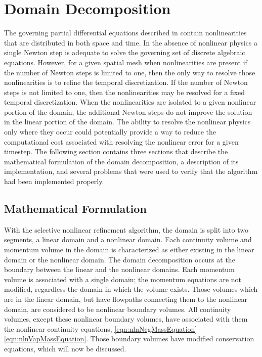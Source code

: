 \chapter{Domain Decomposition}
\label{chap:domain_decomposition}
The governing partial differential equations described in  contain nonlinearities that are distributed in both space and time.
In the absence of nonlinear physics a single Newton step is adequate to solve the governing set of discrete algebraic equations.
However, for a given spatial mesh when nonlinearities are present if the number of Newton steps is limited to one, then the only way to resolve those nonlinearities is to refine the temporal discretization.
If the number of Newton steps is not limited to one, then the nonlinearities may be resolved for a fixed temporal discretization.
When the nonlinearities are isolated to a given nonlinear portion of the domain, the additional Newton steps do not improve the solution in the linear portion of the domain.
The ability to resolve the nonlinear physics only where they occur could potentially provide a way to reduce the computational cost associated with resolving the nonlinear error for a given timestep.
The following section contains three sections that describe the mathematical formulation of the domain decomposition, a description of its implementation, and several problems that were used to verify that the algorithm had been implemented properly.

\section{Mathematical Formulation}
\label{sec:domDecompMath}

With the selective nonlinear refinement algorithm, the domain is split into two segments, a linear domain and a nonlinear domain.
Each continuity volume and momentum volume in the domain is characterized as either existing in the linear domain or the nonlinear domain.
The domain decomposition occurs at the boundary between the linear and the nonlinear domains.
Each momentum volume is associated with a single domain; the momentum equations are not modified, regardless the domain in which the volume exists.
Those volumes which are in the linear domain, but have flowpaths connecting them to the nonlinear domain, are considered to be nonlinear boundary volumes.
All continuity volumes, except these nonlinear boundary volumes, have associated with them the nonlinear continuity equations, \eqref{eqn:nlnNcgMassEquation} -- \eqref{eqn:nlnVapMassEquation}.
Those boundary volumes have modified conservation equations, which will now be discussed.

